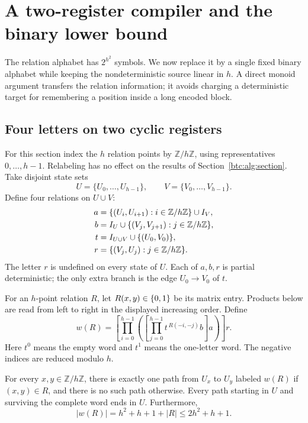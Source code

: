 \section{A two-register compiler and the binary lower bound}
\label{btc:comp:section}

The relation alphabet has $2^{h^2}$ symbols. We now replace it by a
single fixed binary alphabet while keeping the nondeterministic
source linear in $h$. A direct monoid argument transfers the
relation information; it avoids charging a deterministic target for
remembering a position inside a long encoded block.

\subsection{Four letters on two cyclic registers}

For this section index the $h$ relation points by $\mathbb Z/h\mathbb Z$,
using representatives $0,\ldots,h-1$. Relabeling has no effect on
the results of Section~\ref{btc:alg:section}. Take disjoint state sets
\[
 U=\{U_0,\ldots,U_{h-1}\},\qquad
 V=\{V_0,\ldots,V_{h-1}\}.
\]
Define four relations on $U\cup V$:
\begin{align}
 a&=\{(U_i,U_{i+1}):i\in\mathbb Z/h\mathbb Z\}\cup I_V,
       \label{btc:comp:a}\\
 b&=I_U\cup\{(V_j,V_{j+1}):j\in\mathbb Z/h\mathbb Z\},
       \label{btc:comp:b}\\
 t&=I_{U\cup V}\cup\{(U_0,V_0)\},
       \label{btc:comp:t}\\
 r&=\{(V_j,U_j):j\in\mathbb Z/h\mathbb Z\}.
       \label{btc:comp:r}
\end{align}
The letter $r$ is undefined on every state of $U$. Each of $a,b,r$
is partial deterministic; the only extra branch is the edge
$U_0\to V_0$ of $t$.

For an $h$-point relation $R$, let $R(x,y)\in\{0,1\}$ be its matrix
entry. Products below are read from left to right in the displayed
increasing order. Define
\begin{equation}\label{btc:comp:four-code}
 w(R)=
 \left[
  \prod_{i=0}^{h-1}
   \left(
    \left[\prod_{j=0}^{h-1} t^{\,R(-i,-j)}b\right]a
   \right)
 \right]r .
\end{equation}
Here $t^0$ means the empty word and $t^1$ means the one-letter word.
The negative indices are reduced modulo $h$.

\begin{theorem}\label{btc:comp:register}
For every $x,y\in\mathbb Z/h\mathbb Z$, there is exactly one
path from $U_x$ to $U_y$ labeled $w(R)$ if $(x,y)\in R$, and
there is no such path otherwise. Every path starting in $U$
and surviving the complete word ends in $U$.
Furthermore,
\begin{equation}\label{btc:comp:length}
 |w(R)|=h^2+h+1+|R|\le2h^2+h+1.
\end{equation}
\end{theorem}

